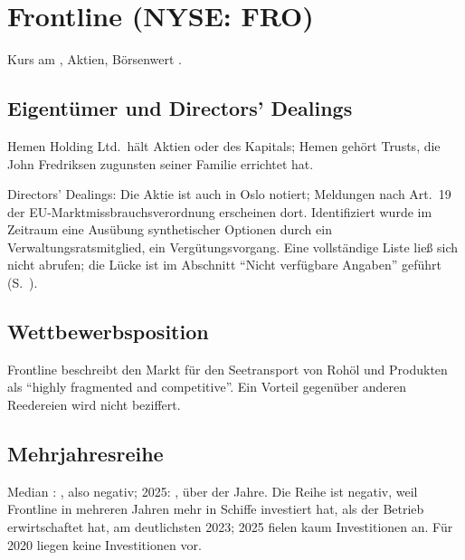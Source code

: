 \section{Frontline (NYSE: FRO)}
\label{sec:fro}

Kurs  am \FroKursDatum{},
\Mio{\FroAktienMio}{} Aktien, B\"orsenwert .

\subsection{Eigent\"umer und Directors' Dealings}

Hemen Holding Ltd.\ h\"alt \Mio{\FroHemenAktien}{} Aktien oder \Pz{\FroHemenAnteil} des
Kapitals; Hemen geh\"ort Trusts, die John Fredriksen zugunsten seiner Familie errichtet
hat.

Directors' Dealings: Die Aktie ist auch in Oslo notiert; Meldungen nach Art.~19 der
EU-Markt\-miss\-brauchs\-ver\-ord\-nung erscheinen dort. Identifiziert wurde im Zeitraum eine
Aus\"ubung synthetischer Optionen durch ein Verwaltungsratsmitglied, ein
Verg\"utungsvorgang. Eine vollst\"andige Liste lie{\ss} sich nicht abrufen; die L\"ucke
ist im Abschnitt \enquote{Nicht verf\"ugbare Angaben} gef\"uhrt (S.~\pageref{sec:luecken}).

\subsection{Wettbewerbsposition}

Frontline beschreibt den Markt f\"ur den Seetransport von Roh\"ol und Produkten als
\enquote{highly fragmented and competitive}. Ein Vorteil gegen\"uber anderen
Reedereien wird nicht beziffert.


\subsection{Mehrjahresreihe}


Median \FroFcfJahre{}: , also negativ; 2025: ,
\"uber \Pz{\FroFcfRang} der Jahre. Die Reihe ist negativ, weil Frontline in mehreren
Jahren mehr in Schiffe investiert hat, als der Betrieb erwirtschaftet hat, am
deutlichsten 2023; 2025 fielen kaum Investitionen an. F\"ur 2020 liegen keine
Investitionen vor.

